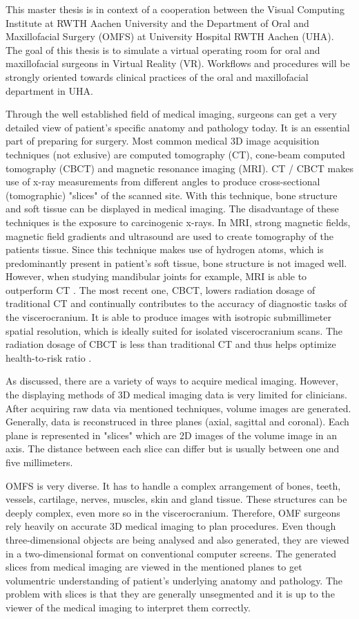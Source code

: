 This master thesis is in context of a cooperation between the Visual Computing Institute at RWTH Aachen University and the Department of Oral and Maxillofacial Surgery (OMFS) at University Hospital RWTH Aachen (UHA).
The goal of this thesis is to simulate a virtual operating room for oral and maxillofacial surgeons in Virtual Reality (VR).
Workflows and procedures will be strongly oriented towards clinical practices of the oral and maxillofacial department in UHA.

Through the well established field of medical imaging, surgeons can get a very detailed view of patient’s specific anatomy and pathology today. 
It is an essential part of preparing for surgery.
Most common medical 3D image acquisition techniques (not exlusive) are computed tomography (CT), cone-beam computed tomography (CBCT) and magnetic resonance imaging (MRI).
CT / CBCT makes use of x-ray measurements from different angles to produce cross-sectional (tomographic) "slices" of the scanned site.
With this technique, bone structure and soft tissue can be displayed in medical imaging.
The disadvantage of these techniques is the exposure to carcinogenic x-rays.
In MRI, strong magnetic fields, magnetic field gradients and ultrasound are used to create tomography of the patients tissue.
Since this technique makes use of hydrogen atoms, which is predominantly present in patient's soft tissue, bone structure is not imaged well.
However, when studying mandibular joints for example, MRI is able to outperform CT \cite{RN65}.
The most recent one, CBCT, lowers radiation dosage of traditional CT and continually contributes to the accuracy of diagnostic tasks of the viscerocranium.
It is able to produce images with isotropic submillimeter spatial resolution, which is ideally suited for isolated viscerocranium scans. 
The radiation dosage of CBCT is less than traditional CT and thus helps optimize health-to-risk ratio \cite{WHITE2008689}.

As discussed, there are a variety of ways to acquire medical imaging.
However, the displaying methods of 3D medical imaging data is very limited for clinicians.
After acquiring raw data via mentioned techniques, volume images are generated. 
Generally, data is reconstruced in three planes (axial, sagittal and coronal).
Each plane is represented in "slices" which are 2D images of the volume image in an axis.
The distance between each slice can differ but is usually between one and five millimeters.

OMFS is very diverse. It has to handle a complex arrangement of bones, teeth, vessels, cartilage, nerves, muscles, skin and gland tissue.
These structures can be deeply complex, even more so in the viscerocranium.
Therefore, OMF surgeons rely heavily on accurate 3D medical imaging to plan procedures.
Even though three-dimensional objects are being analysed and also generated, they are viewed in a two-dimensional format on conventional computer screens.
The generated slices from medical imaging are viewed in the mentioned planes to get volumentric understanding of patient's underlying anatomy and pathology.
The problem with slices is that they are generally unsegmented and it is up to the viewer of the medical imaging to interpret them correctly.

